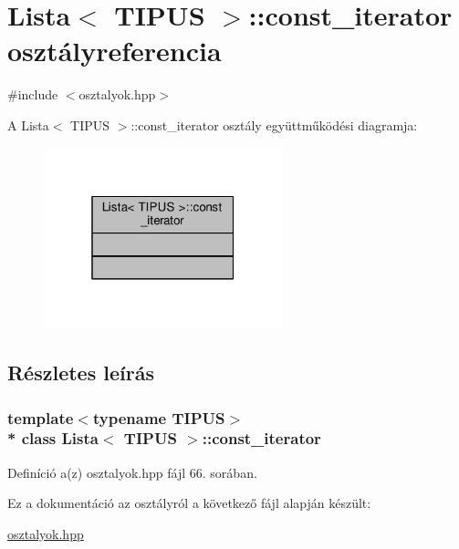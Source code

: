 \hypertarget{classLista_1_1const__iterator}{}\section{Lista$<$ T\+I\+P\+US $>$\+:\+:const\+\_\+iterator osztályreferencia}
\label{classLista_1_1const__iterator}


{\ttfamily \#include $<$osztalyok.\+hpp$>$}



A Lista$<$ T\+I\+P\+US $>$\+:\+:const\+\_\+iterator osztály együttműködési diagramja\+:\nopagebreak
\begin{figure}[H]
\begin{center}
\leavevmode
\includegraphics[width=196pt]{classLista_1_1const__iterator__coll__graph}
\end{center}
\end{figure}


\subsection{Részletes leírás}
\subsubsection*{template$<$typename T\+I\+P\+US$>$\\*
class Lista$<$ T\+I\+P\+U\+S $>$\+::const\+\_\+iterator}



Definíció a(z) osztalyok.\+hpp fájl 66. sorában.



Ez a dokumentáció az osztályról a következő fájl alapján készült\+:\begin{DoxyCompactItemize}
\item 
\hyperlink{osztalyok_8hpp}{osztalyok.\+hpp}\end{DoxyCompactItemize}
